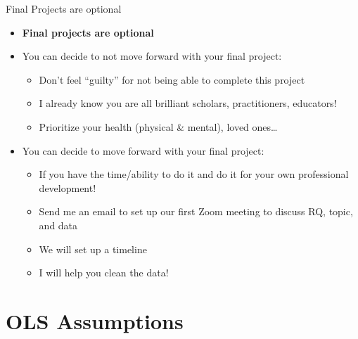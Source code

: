 \documentclass[8pt,ignorenonframetext,dvipsnames]{beamer}
\providecommand{\tightlist}{%
  \setlength{\itemsep}{0pt}\setlength{\parskip}{0pt}}
\renewcommand{\textbf}[1]{{\color{darkgray}\bfseries\fontfamily{Montserrat-TOsF}#1}}
\let\olditem\item
\renewcommand{\item}{%
  \olditem\vspace{4pt}
}
\begin{document}
\begin{frame}{Final Projects are optional}
\protect\hypertarget{final-projects-are-optional}{}

\begin{itemize}
\tightlist
\item
  \textbf{Final projects are optional}
\item
  You can decide to not move forward with your final project:

  \begin{itemize}
  \tightlist
  \item
    Don't feel ``guilty'' for not being able to complete this project
  \item
    I already know you are all brilliant scholars, practitioners,
    educators!
  \item
    Prioritize your health (physical \& mental), loved ones\ldots{}
  \end{itemize}
\item
  You can decide to move forward with your final project:

  \begin{itemize}
  \tightlist
  \item
    If you have the time/ability to do it and do it for your own
    professional development!
  \item
    Send me an email to set up our first Zoom meeting to discuss RQ,
    topic, and data
  \item
    We will set up a timeline
  \item
    I will help you clean the data!
  \end{itemize}
\end{itemize}

\end{frame}

\hypertarget{ols-assumptions}{%
\section{OLS Assumptions}\label{ols-assumptions}}
\end{document}
